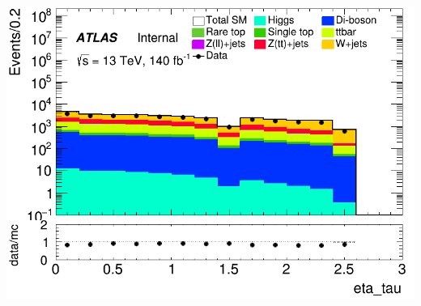 \documentclass[usenames,dvipsnames]{beamer}
\begin{document}
\begin{frame}
\begin{minipage}{0.32\textwidth}
        \centering
        \includegraphics[width=\textwidth]{graphics/LH_met/LH_met_eta_tau.png}
    \end{minipage}
\end{frame}
\end{document}
